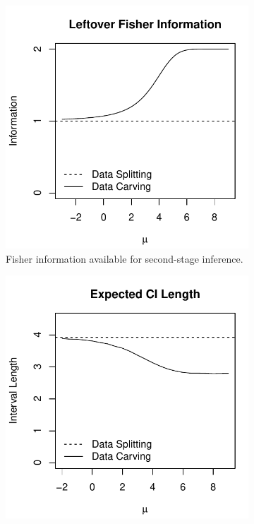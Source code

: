 \documentclass{article}
\theoremstyle{definition}
\begin{document}
\begin{figure}
  \centering
  \begin{subfigure}[t]{.4\textwidth}
    \includegraphics[width=\textwidth]{figs/informationBivar.pdf}
    \caption{Fisher information available for second-stage inference.}
    \label{fig:ssBad:info}
  \end{subfigure}
  \hspace{.1\textwidth}
  \begin{subfigure}[t]{.4\textwidth}
    \includegraphics[width=\textwidth]{figs/ciBivar.pdf}

\end{subfigure}
\end{figure}
\end{document}
